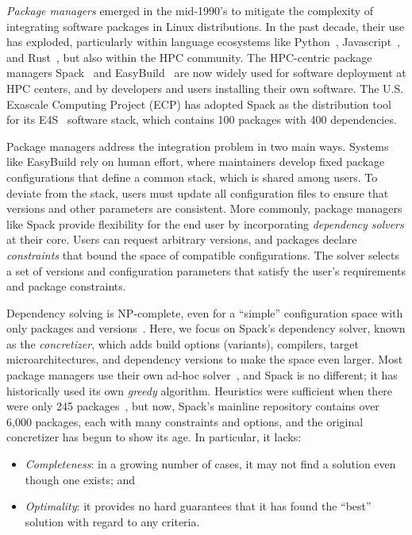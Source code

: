 {\it Package managers} emerged in the mid-1990's to mitigate the complexity of
integrating software packages in Linux distributions. In the past decade, their use has
exploded, particularly within language ecosystems like Python~\cite{pip},
Javascript~\cite{npm}, and Rust~\cite{cargo}, but also within the HPC community. The
HPC-centric package managers Spack~\cite{gamblin+:sc15} and
EasyBuild~\cite{hoste+:pyhpc12} are now widely used for software deployment at HPC
centers, and by developers and users installing their own software. The U.S. Exascale
Computing Project (ECP) has adopted Spack as the distribution tool for its
E4S~\cite{e4s} software stack, which contains 100 packages with 400 dependencies.

Package managers address the integration problem in two main ways. Systems like
EasyBuild rely on human effort, where maintainers develop fixed package configurations
that define a common stack, which is shared among users. To deviate from the stack,
users must update all configuration files to ensure that versions and other parameters
are consistent. More commonly, package managers like Spack provide flexibility for the
end user by incorporating {\it dependency solvers} at their core. Users can request
arbitrary versions, and packages declare {\it constraints} that bound the space of
compatible configurations. The solver selects a set of versions and configuration
parameters that satisfy the user's requirements and package constraints.

Dependency solving is NP-complete, even for a ``simple'' configuration space with only
packages and versions~\cite{dicosmo:edos,cox:version-sat}. Here, we focus on Spack's
dependency solver, known as the {\it concretizer}, which adds build options (variants),
compilers, target microarchitectures, and dependency versions to make the space even
larger. Most package managers use their own ad-hoc solver~\cite{abate2020dependency},
and Spack is no different; it has historically used its own {\it greedy} algorithm.
Heuristics were sufficient when there were only 245 packages~\cite{gamblin+:sc15}, but
now, Spack's mainline repository contains over 6,000 packages, each with many
constraints and options, and the original concretizer has begun to show its age. In
particular, it lacks:
\begin{itemize}
\item {\it Completeness}: in a growing number of cases, it may not find a solution even
  though one exists; and
\item {\it Optimality}: it provides no hard guarantees that it has found the ``best''
  solution with regard to any criteria.
\end{itemize}

